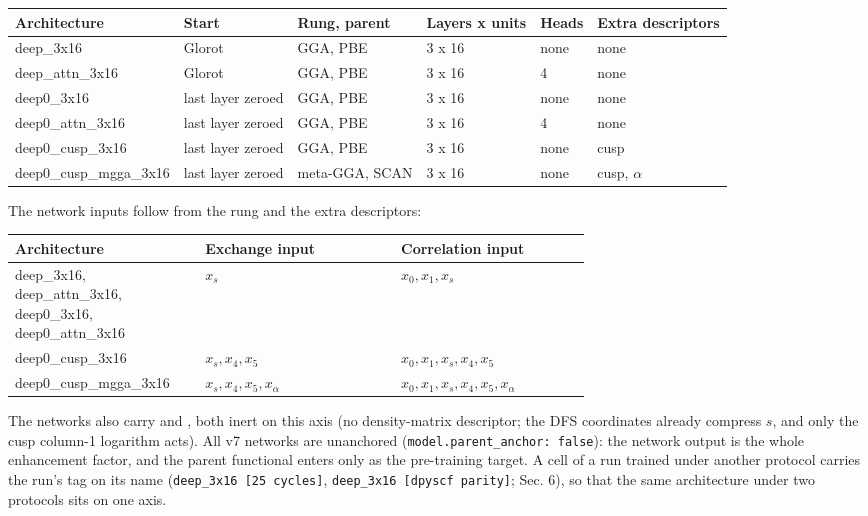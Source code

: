 \documentclass[10pt,a4paper]{article}
\begin{document}
\begin{landscape}
\begin{footnotesize}
\begin{longtable}{llllll}
\toprule Architecture & Start & Rung, parent & Layers x units & Heads & Extra descriptors \\ \midrule \endhead
deep\_3x16 & Glorot & GGA, PBE & 3 x 16 & none & none \\
deep\_attn\_3x16 & Glorot & GGA, PBE & 3 x 16 & 4 & none \\
deep0\_3x16 & last layer zeroed & GGA, PBE & 3 x 16 & none & none \\
deep0\_attn\_3x16 & last layer zeroed & GGA, PBE & 3 x 16 & 4 & none \\
deep0\_cusp\_3x16 & last layer zeroed & GGA, PBE & 3 x 16 & none & cusp \\
deep0\_cusp\_mgga\_3x16 & last layer zeroed & meta-GGA, SCAN & 3 x 16 & none & cusp, $\alpha$ \\
\bottomrule \end{longtable}
\end{footnotesize}
\end{landscape}


The network inputs follow from the rung and the extra descriptors:

\begin{small}
\begin{longtable}{p{0.334\linewidth}lp{0.334\linewidth}}
\toprule Architecture & Exchange input & Correlation input \\ \midrule \endhead
deep\_3x16, deep\_attn\_3x16, deep0\_3x16, deep0\_attn\_3x16 & $x_s$ & $x_0, x_1, x_s$ \\
deep0\_cusp\_3x16 & $x_s, x_4, x_5$ & $x_0, x_1, x_s, x_4, x_5$ \\
deep0\_cusp\_mgga\_3x16 & $x_s, x_4, x_5, x_\alpha$ & $x_0, x_1, x_s, x_4, x_5, x_\alpha$ \\
\bottomrule \end{longtable}
\end{small}


The  networks also carry  and , both inert on this axis (no density-matrix descriptor; the DFS coordinates already compress $s$, and only the cusp column-1 logarithm acts). All v7 networks are unanchored (\texttt{model.parent\_anchor: false}): the network output is the whole enhancement factor, and the parent functional enters only as the pre-training target. A cell of a run trained under another protocol carries the run's tag on its name (\texttt{deep\_3x16 [25 cycles]}, \texttt{deep\_3x16 [dpyscf parity]}; Sec. 6), so that the same architecture under two protocols sits on one axis.
\end{document}
